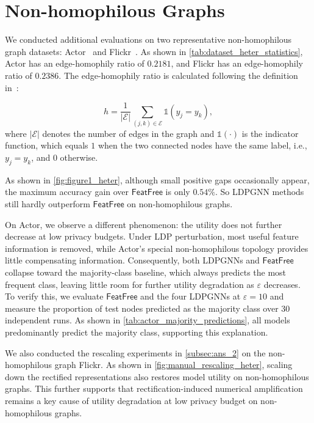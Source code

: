 \documentclass[conference,compsoc]{IEEEtran}
\theoremstyle{boldplain}
\theoremstyle{bolddefinition}
\theoremstyle{remark}
\newcommand{\ff}{\ensuremath{\mathsf{FeatFree}}\xspace}
\newcommand{\ldpgnn}{LDPGNN\xspace}
\newcommand{\ldpgnns}{LDPGNNs\xspace}
\begin{document}
{
\color{purple!80}
\section{Non-homophilous Graphs}
\label{app:non_homophilous_graphs}
We conducted additional evaluations on two representative non-homophilous graph datasets: Actor~\cite{pei2020geomgcn} and Flickr~\cite{huang2017lane}. 
As shown in \autoref{tab:dataset_heter_statistics}, Actor has an edge-homophily ratio of $0.2181$, and Flickr has an edge-homophily ratio of $0.2386$. 
The edge-homophily ratio is calculated following the definition in~\cite{zhu2020h2gcn}:

\begin{equation}
h
=
\frac{1}{|\mathcal{E}|}
\sum_{(j,k)\in\mathcal{E}}
\mathds{1}(y_j = y_k),
\end{equation}
where $|\mathcal{E}|$ denotes the number of edges in the graph and
$\mathds{1}(\cdot)$ is the indicator function, which equals $1$ when
the two connected nodes have the same label, i.e., $y_j = y_k$, and $0$ otherwise.


As shown in \autoref{fig:figure1_heter}, although small positive gaps occasionally appear, the maximum accuracy gain over \ff is only $0.54\%$. So \ldpgnn methods still hardly outperform \ff on non-homophilous graphs. 

On Actor, we observe a different phenomenon: the utility does not further decrease at low privacy budgets. Under LDP perturbation, most useful feature information is removed, while Actor's special non-homophilous topology provides little compensating information. Consequently, both \ldpgnns and \ff collapse toward the majority-class baseline, which always predicts the most frequent class, leaving little room for further utility degradation as $\varepsilon$ decreases. To verify this, we evaluate \ff and the four \ldpgnns at $\varepsilon=10$ and measure the proportion of test nodes predicted as the majority class over 30 independent runs. As shown in \autoref{tab:actor_majority_predictions}, all models predominantly predict the majority class, supporting this explanation.


We also conducted the rescaling experiments in \autoref{subsec:ans_2} on the non-homophilous graph Flickr. As shown in \autoref{fig:manual_rescaling_heter}, scaling down the rectified representations also restores model utility on non-homophilous graphs. This further supports that rectification-induced numerical amplification remains a key cause of utility degradation at low privacy budget on non-homophilous graphs.


}
\end{document}
